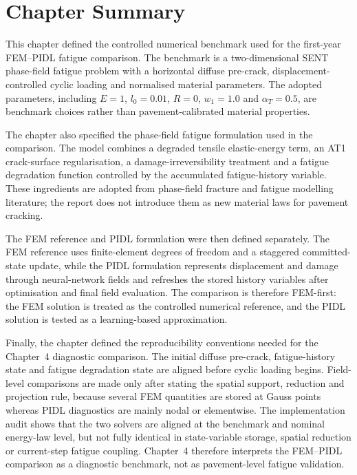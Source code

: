 \section{Chapter Summary}
\label{sec:c3_summary}

This chapter defined the controlled numerical benchmark used for the first-year FEM--PIDL fatigue comparison. The benchmark is a two-dimensional SENT phase-field fatigue problem with a horizontal diffuse pre-crack, displacement-controlled cyclic loading and normalised material parameters. The adopted parameters, including \(E=1\), \(l_0=0.01\), \(R=0\), \(w_1=1.0\) and \(\alpha_T=0.5\), are benchmark choices rather than pavement-calibrated material properties.

The chapter also specified the phase-field fatigue formulation used in the comparison. The model combines a degraded tensile elastic-energy term, an AT1 crack-surface regularisation, a damage-irreversibility treatment and a fatigue degradation function controlled by the accumulated fatigue-history variable. These ingredients are adopted from phase-field fracture and fatigue modelling literature; the report does not introduce them as new material laws for pavement cracking.

The FEM reference and PIDL formulation were then defined separately. The FEM reference uses finite-element degrees of freedom and a staggered committed-state update, while the PIDL formulation represents displacement and damage through neural-network fields and refreshes the stored history variables after optimisation and final field evaluation. The comparison is therefore FEM-first: the FEM solution is treated as the controlled numerical reference, and the PIDL solution is tested as a learning-based approximation.

Finally, the chapter defined the reproducibility conventions needed for the Chapter~4 diagnostic comparison. The initial diffuse pre-crack, fatigue-history state and fatigue degradation state are aligned before cyclic loading begins. Field-level comparisons are made only after stating the spatial support, reduction and projection rule, because several FEM quantities are stored at Gauss points whereas PIDL diagnostics are mainly nodal or elementwise. The implementation audit shows that the two solvers are aligned at the benchmark and nominal energy-law level, but not fully identical in state-variable storage, spatial reduction or current-step fatigue coupling. Chapter~4 therefore interprets the FEM--PIDL comparison as a diagnostic benchmark, not as pavement-level fatigue validation.

